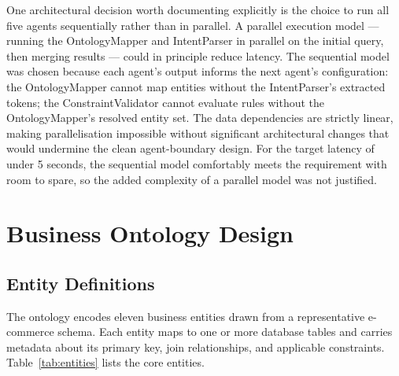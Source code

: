 \documentclass[12pt,a4paper]{report}
\begin{document}
One architectural decision worth documenting explicitly is the choice to run all five agents sequentially rather than in parallel. A parallel execution model — running the OntologyMapper and IntentParser in parallel on the initial query, then merging results — could in principle reduce latency. The sequential model was chosen because each agent's output informs the next agent's configuration: the OntologyMapper cannot map entities without the IntentParser's extracted tokens; the ConstraintValidator cannot evaluate rules without the OntologyMapper's resolved entity set. The data dependencies are strictly linear, making parallelisation impossible without significant architectural changes that would undermine the clean agent-boundary design. For the target latency of under 5 seconds, the sequential model comfortably meets the requirement with room to spare, so the added complexity of a parallel model was not justified.

\section{Business Ontology Design}
\label{sec:ontology-design}

\subsection{Entity Definitions}
\label{subsec:entities}

The ontology encodes eleven business entities drawn from a representative e-commerce schema. Each entity maps to one or more database tables and carries metadata about its primary key, join relationships, and applicable constraints. Table~\ref{tab:entities} lists the core entities.
\end{document}
